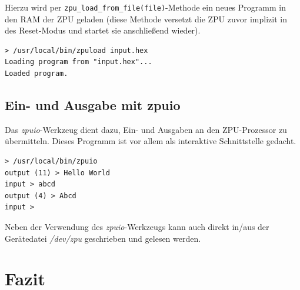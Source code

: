 \documentclass[11pt]{scrartcl}
\begin{document}
Hierzu wird per \texttt{zpu\_load\_from\_file(file)}-Methode ein neues Programm in den RAM der ZPU geladen (diese Methode versetzt die ZPU zuvor implizit in des Reset-Modus und startet sie anschließend wieder).

\begin{lstlisting}[caption=Verwendung des zpuload-Werkzeugs]
> /usr/local/bin/zpuload input.hex
Loading program from "input.hex"...
Loaded program.
\end{lstlisting}

\subsection{Ein- und Ausgabe mit zpuio}

Das \emph{zpuio}-Werkzeug dient dazu, Ein- und Ausgaben an den ZPU-Prozessor zu übermitteln. Dieses Programm ist vor allem als interaktive Schnittstelle gedacht.

\begin{lstlisting}[caption=Verwendung des zpuio-Werkzeugs]
> /usr/local/bin/zpuio
output (11) > Hello World
input > abcd
output (4) > Abcd
input >
\end{lstlisting}

Neben der Verwendung des \emph{zpuio}-Werkzeugs kann auch direkt in/aus der Gerätedatei \emph{/dev/zpu} geschrieben und gelesen werden.

\pagebreak
\section{Fazit}

\pagebreak %

\fancyhead[R]{}

\thispagestyle{empty}

\renewcommand*{\biburlprefix}{(URL: }
\renewcommand*{\biburlsuffix}{)}

\pagebreak
{} %


\appendix
\end{document}
